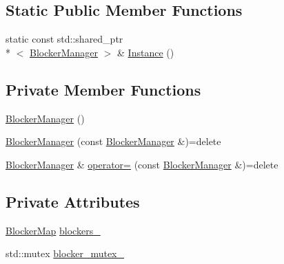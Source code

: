 \subsection*{Static Public Member Functions}
\begin{DoxyCompactItemize}
\item 
static const std\-::shared\-\_\-ptr\\*
$<$ \hyperlink{classapollo_1_1cyber_1_1blocker_1_1BlockerManager}{Blocker\-Manager} $>$ \& \hyperlink{classapollo_1_1cyber_1_1blocker_1_1BlockerManager_a2fd73d2d9c2a50820750d68aea0a9c1b}{Instance} ()
\end{DoxyCompactItemize}
\subsection*{Private Member Functions}
\begin{DoxyCompactItemize}
\item 
\hyperlink{classapollo_1_1cyber_1_1blocker_1_1BlockerManager_ad5317e0dea1d15074e99c073d3aa9615}{Blocker\-Manager} ()
\item 
\hyperlink{classapollo_1_1cyber_1_1blocker_1_1BlockerManager_a42ef19cb5d583093f35ef2a85f8ceb88}{Blocker\-Manager} (const \hyperlink{classapollo_1_1cyber_1_1blocker_1_1BlockerManager}{Blocker\-Manager} \&)=delete
\item 
\hyperlink{classapollo_1_1cyber_1_1blocker_1_1BlockerManager}{Blocker\-Manager} \& \hyperlink{classapollo_1_1cyber_1_1blocker_1_1BlockerManager_a315c9dc141d141bf0c707bf3dc56b841}{operator=} (const \hyperlink{classapollo_1_1cyber_1_1blocker_1_1BlockerManager}{Blocker\-Manager} \&)=delete
\end{DoxyCompactItemize}
\subsection*{Private Attributes}
\begin{DoxyCompactItemize}
\item 
\hyperlink{classapollo_1_1cyber_1_1blocker_1_1BlockerManager_aab93de92687db46229801f733c741334}{Blocker\-Map} \hyperlink{classapollo_1_1cyber_1_1blocker_1_1BlockerManager_a63cbedd8313717b3f8fc8ad8133329bc}{blockers\-\_\-}
\item 
std\-::mutex \hyperlink{classapollo_1_1cyber_1_1blocker_1_1BlockerManager_a84ba4d0f791c3ff2b835dbfa91d325ea}{blocker\-\_\-mutex\-\_\-}
\end{DoxyCompactItemize}


